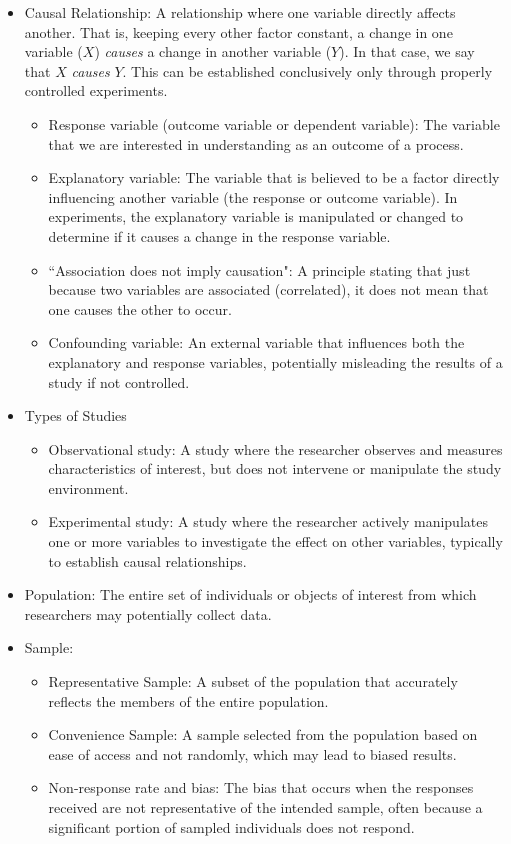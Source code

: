 \documentclass{article}
\begin{document}
\begin{itemize}
\item Causal Relationship: A relationship where one variable directly affects another. That is, keeping every other factor constant, a change in one variable ($X$) \emph{causes} a change in another variable ($Y$). In that case, we say that $X$ \emph{causes} $Y$. This can be established conclusively only through properly controlled experiments.
    \begin{itemize}
        \item Response variable (outcome variable or dependent variable): The variable that we are interested in understanding as an outcome of a process.
        \item Explanatory variable: The variable that is believed to be a factor directly influencing another variable (the response or outcome variable). In experiments, the explanatory variable is manipulated or changed to determine if it causes a change in the response variable.
        \item ``Association does not imply causation": A principle stating that just because two variables are associated (correlated), it does not mean that one causes the other to occur.
        \item Confounding variable: An external variable that influences both the explanatory and response variables, potentially misleading the results of a study if not controlled.
    \end{itemize}
\item Types of Studies
    \begin{itemize}
        \item Observational study: A study where the researcher observes and measures characteristics of interest, but does not intervene or manipulate the study environment.
        \item Experimental study: A study where the researcher actively manipulates one or more variables to investigate the effect on other variables, typically to establish causal relationships.
    \end{itemize}
\item Population: The entire set of individuals or objects of interest from which researchers may potentially collect data.
\item Sample:
    \begin{itemize}
        \item Representative Sample: A subset of the population that accurately reflects the members of the entire population.
        \item Convenience Sample: A sample selected from the population based on ease of access and not randomly, which may lead to biased results.
        \item Non-response rate and bias: The bias that occurs when the responses received are not representative of the intended sample, often because a significant portion of sampled individuals does not respond.
    \end{itemize}


\end{itemize}
\end{document}
